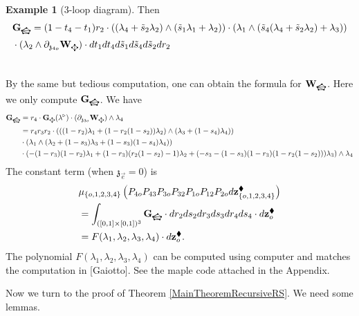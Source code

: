 \documentclass[11pt]{amsart}
\newcommand{\bgraphG}{
  \mathbf{G}_{\tikz[baseline=-0.5ex]{
      \coordinate (A) at (0,0);
      \coordinate (B) at (2mm,0);
      \coordinate (C) at (2.5mm,1mm);
      \coordinate (D) at (1.25mm,2mm);
      \coordinate (E) at (-0.5mm,1mm);

      \fill (A) circle (0.25mm);
      \fill (B) circle (0.25mm);
      \fill (C) circle (0.25mm);
      \fill (D) circle (0.25mm);
      \fill (E) circle (0.25mm);

      \draw (A) -- (B);
      \draw (B) -- (C);
      \draw (C) -- (D);
      \draw (D) -- (E);
      \draw (E) -- (A);

      \draw (E) -- (A);
      \draw (E) -- (B);
      \draw (E) -- (C);
      \draw (E) -- (D);
  }}
}
\newcommand{\bgraphW}{
  \mathbf{W}_{\tikz[baseline=-0.5ex]{
      \coordinate (A) at (0,0);
      \coordinate (B) at (2mm,0);
      \coordinate (C) at (2.5mm,1mm);
      \coordinate (D) at (1.25mm,2mm);
      \coordinate (E) at (-0.5mm,1mm);

      \fill (A) circle (0.25mm);
      \fill (B) circle (0.25mm);
      \fill (C) circle (0.25mm);
      \fill (D) circle (0.25mm);
      \fill (E) circle (0.25mm);

      \draw (A) -- (B);
      \draw (B) -- (C);
      \draw (C) -- (D);
      \draw (D) -- (E);
      \draw (E) -- (A);

      \draw (E) -- (A);
      \draw (E) -- (B);
      \draw (E) -- (C);
      \draw (E) -- (D);
  }}
}
\newcommand{\agraphG}{
  \mathbf{G}_{\tikz[baseline=-0.5ex]{
      \coordinate (A) at (0,0);
      \coordinate (B) at (2mm,0);
      \coordinate (C) at (1mm,1mm);
      \coordinate (D) at (1mm,-1mm);

      \fill (A) circle (0.25mm);
      \fill (B) circle (0.25mm);
      \fill (C) circle (0.25mm);
      \fill (D) circle (0.25mm);

      \draw (A) -- (C);
      \draw (A) -- (D);
      \draw (C) -- (D);
      \draw (B) -- (C);
      \draw (B) -- (D);
  }}
}
\newcommand{\agraphW}{
  \mathbf{W}_{\tikz[baseline=-0.5ex]{
      \coordinate (A) at (0,0);
      \coordinate (B) at (2mm,0);
      \coordinate (C) at (1mm,1mm);
      \coordinate (D) at (1mm,-1mm);

      \fill (A) circle (0.25mm);
      \fill (B) circle (0.25mm);
      \fill (C) circle (0.25mm);
      \fill (D) circle (0.25mm);

      \draw (A) -- (C);
      \draw (A) -- (D);
      \draw (C) -- (D);
      \draw (B) -- (C);
      \draw (B) -- (D);
  }}
}
\theoremstyle{definition}
\newtheorem{exa}[thm]{Example}
\theoremstyle{remark}
\numberwithin{equation}{section}
\begin{document}
\begin{exa}[3-loop diagram]
  Then
  \begin{align*}
 &\bgraphG =  (1-t_4-t_1)r_2\cdot((\lambda_4+\tilde{s}_2\lambda_2)\wedge(\tilde{s}_1\lambda_1+\lambda_2))\cdot (\lambda_1\wedge(\tilde{s}_4(\lambda_4+\tilde{s}_2\lambda_2)+\lambda_3)) \\ &\cdot  (\lambda_2\wedge \partial_{\mathfrak{z}_{4o}}\agraphW)\cdot dt_1dt_4d\tilde{s}_1d\tilde{s}_4d\tilde{s}_2dr_2 \\
     &
  \end{align*}
\fi

By the same but tedious computation, one can obtain the formula for $\bgraphW$. Here we only compute $\bgraphG$.
We have
\begin{align*}
   \bgraphG&= r_4\cdot \agraphG(\lambda^\triangleright) \cdot(\partial_{\mathfrak{z}_{3o}}\agraphW)\wedge \lambda_4  \\
   &=r_4r_3r_2\cdot \left(\left((1-r_2)\lambda_1+(1-r_2(1-s_2))\lambda_2\right)\wedge (\lambda_3+(1-s_4)\lambda_4)\right) \\
   & \cdot\left(\lambda_1\wedge\left(\lambda_2+(1-s_3)\lambda_3+(1-s_3)(1-s_4)\lambda_4\right) \right)\\ &\cdot  \left(-(1-r_3)(1-r_2)\lambda_1+(1-r_3)(r_2(1-s_2)-1)\lambda_2+(-s_3-(1-s_3)(1-r_3)(1-r_2(1-s_2)))\lambda_3\right)\wedge \lambda_4
\end{align*}
The constant term (when $\mathfrak{z}_{\vec{e}}=0$) is
    \begin{align*}
&\mu_{\{o,1,2,3,4\}}\left(P_{4o}P_{43}P_{3o}P_{32}P_{1o}P_{12}P_{2o}d\mathbf{z}^{\blacklozenge}_{\{o,1,2,3,4\}}\right)
\\
&=\int_{([0,1]\times[0,1])^3}\bgraphG\cdot dr_2ds_2dr_3ds_3dr_4ds_4\cdot d\mathbf{z}^{\blacklozenge}_o\\
&=F(\lambda_1,\lambda_2,\lambda_3,\lambda_4)\cdot d\mathbf{z}^{\blacklozenge}_o.
  \end{align*}
  The polynomial $F(\lambda_1,\lambda_2,\lambda_3,\lambda_4)$ can be computed using computer and matches the computation in [Gaiotto]. See the maple code attached in the Appendix.
\end{exa}
Now we turn to the proof of Theorem \ref{MainTheoremRecursiveRS}. We need some lemmas.
\end{document}
